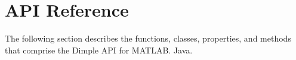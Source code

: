 \section{API Reference}

The following section describes the functions, classes, properties, and methods that comprise the Dimple API for \ifmatlab MATLAB. \fi \ifjava Java. \fi









\ifmatlab

\fi


